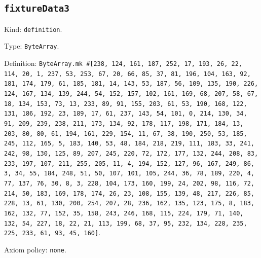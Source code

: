 \documentclass[11pt]{article}
\begin{document}
\subsection*{\texttt{fixtureData3}}
\noindent Kind: \texttt{definition}.\par
\noindent Type: \texttt{ByteArray}.\par
\noindent Definition: \texttt{ByteArray.mk \#[238, 124, 161, 187, 252, 17, 193, 26, 22, 114, 20, 1, 237, 53, 253, 67, 20, 66, 85, 37, 81, 196, 104, 163, 92, 181, 174, 179, 61, 185, 181, 14, 143, 53, 187, 56, 109, 135, 190, 226, 124, 167, 134, 139, 244, 54, 152, 157, 102, 161, 169, 68, 207, 58, 67, 18, 134, 153, 73, 13, 233, 89, 91, 155, 203, 61, 53, 190, 168, 122, 131, 186, 192, 23, 189, 17, 61, 237, 143, 54, 101, 0, 214, 130, 34, 91, 209, 239, 238, 211, 173, 134, 92, 178, 117, 198, 171, 184, 13, 203, 80, 80, 61, 194, 161, 229, 154, 11, 67, 38, 190, 250, 53, 185, 245, 112, 165, 5, 183, 140, 53, 48, 184, 218, 219, 111, 183, 33, 241, 242, 98, 130, 125, 89, 207, 245, 220, 72, 172, 177, 132, 244, 208, 83, 233, 197, 107, 211, 255, 205, 11, 4, 194, 152, 127, 96, 167, 249, 86, 3, 34, 55, 184, 248, 51, 50, 107, 101, 105, 244, 36, 78, 189, 220, 4, 77, 137, 76, 30, 8, 3, 228, 104, 173, 160, 199, 24, 202, 98, 116, 72, 214, 50, 183, 169, 178, 174, 26, 23, 108, 155, 139, 48, 217, 226, 85, 228, 13, 61, 130, 200, 254, 207, 28, 236, 162, 135, 123, 175, 8, 183, 162, 132, 77, 152, 35, 158, 243, 246, 168, 115, 224, 179, 71, 140, 132, 54, 227, 18, 22, 21, 113, 199, 68, 37, 95, 232, 134, 228, 235, 225, 233, 61, 93, 45, 160]}.\par
\noindent Axiom policy: \texttt{none}.\par
\end{document}
